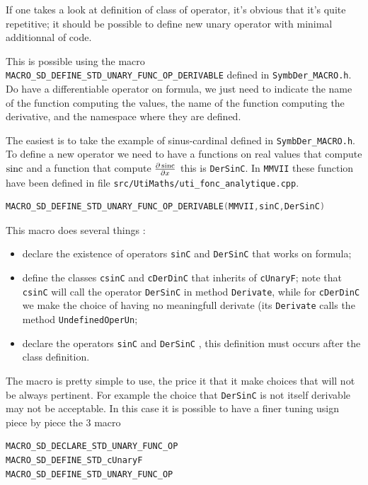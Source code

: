 If one takes a look at definition of class of operator, it's obvious that it's quite repetitive;
it should be possible to define new unary operator with minimal additionnal of code.

This is possible using the macro {\tt MACRO\_SD\_DEFINE\_STD\_UNARY\_FUNC\_OP\_DERIVABLE}
defined in {\tt SymbDer\_MACRO.h}.
Do have a differentiable operator on formula, we just need to indicate the name
of the function computing the values, the name of the function computing the derivative,
and the namespace where they are defined.

The easiest is to take the example of sinus-cardinal defined in  {\tt SymbDer\_MACRO.h}.
To define a new operator we need to have a functions on real values that compute $\operatorname{sinc}$ and a function
that compute $\frac{\partial \operatorname{sinc}}{\partial x}$  this is {\tt DerSinC}.  In {\tt MMVII} these function have been
defined in file  {\tt src/UtiMaths/uti\_fonc\_analytique.cpp}. 


\begin{lstlisting}[language=c++]
MACRO_SD_DEFINE_STD_UNARY_FUNC_OP_DERIVABLE(MMVII,sinC,DerSinC)
\end{lstlisting}

This macro does several things :

\begin{itemize}
	\item  declare the existence of operators {\tt sinC} and {\tt DerSinC} that works on formula;

	\item  define the classes  {\tt csinC} and {\tt cDerDinC} that inherits of {\tt cUnaryF};
		note that {\tt csinC}  will call the operator {\tt DerSinC} in method {\tt Derivate},
		while for {\tt cDerDinC}  we make the choice of having no meaningfull derivate
		(its {\tt Derivate} calls the method {\tt UndefinedOperUn};

	\item  declare the operators {\tt sinC} and {\tt DerSinC} , this definition must occurs  after the class
		definition.
\end{itemize}

The macro is pretty simple to use, the price it that it make choices that will not be always pertinent.
For example the choice that {\tt DerSinC} is not itself derivable may not be acceptable.
In this case it is possible to have a finer tuning usign piece by piece the $3$ macro

\begin{lstlisting}[language=c++]
MACRO_SD_DECLARE_STD_UNARY_FUNC_OP
MACRO_SD_DEFINE_STD_cUnaryF
MACRO_SD_DEFINE_STD_UNARY_FUNC_OP
\end{lstlisting}

